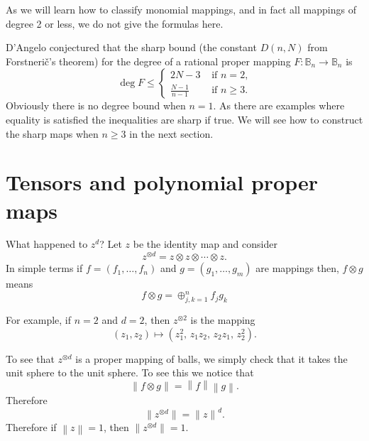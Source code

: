 \documentclass[12pt,openany]{book}
\newcommand{\norm}[1]{\left\lVert {#1} \right\rVert}
\newcommand{\bB}{{\mathbb{B}}}
\newcommand{\sectionnewpage}{}
\theoremstyle{plain}
\theoremstyle{remark}
\theoremstyle{definition}
\theoremstyle{exercise}
\theoremstyle{example}
\begin{document}
As we will learn how to classify monomial mappings, and in fact all mappings
of degree 2 or less, we do not give the formulas here.

D'Angelo
conjectured that the sharp bound
(the constant $D(n,N)$ from Forstneri\v{c}'s theorem)
for the degree of a rational proper mapping
$F \colon \bB_n \to \bB_n$ is
\begin{equation}
\deg F \leq
\begin{cases}
2N-3 & \text{ if $n=2$,} \\
\frac{N-1}{n-1} & \text{ if $n\geq 3$.}
\end{cases}
\end{equation}
Obviously there is no degree bound when $n=1$.  As there are examples where
equality is satisfied the inequalities are sharp if true.  We will see how
to construct the sharp maps when $n \geq 3$ in the next section.


\sectionnewpage
\section{Tensors and polynomial proper maps}

What happened to $z^d$?  Let $z$ be the identity map and consider
\begin{equation}
z^{\otimes d} =  z \otimes z \otimes \cdots \otimes z .
\end{equation}
In simple terms if $f = (f_1,\ldots,f_n)$
and $g=(g_1,\ldots,g_m)$ are mappings then,
$f \otimes g$ means
\begin{equation}
f \otimes g = \oplus_{j,k=1}^n f_j g_k
\end{equation}

For example, if $n=2$ and $d=2$, then $z^{\otimes 2}$
is the mapping
\begin{equation}
(z_1,z_2) \mapsto
(z_1^2, \, z_1z_2, \, z_2z_1, \, z_2^2) .
\end{equation}

To see that $z^{\otimes d}$ is a proper mapping of balls, we simply check
that
it takes the unit sphere to the unit sphere.
To see this we notice that
\begin{equation}
\norm{ f \otimes g } =
\norm{f} \norm{g} .
\end{equation}
Therefore
\begin{equation}
\lVert z^{\otimes d} \rVert = 
{\lVert z \rVert}^d .
\end{equation}
Therefore if $\norm{z} = 1$, then 
$\lVert z^{\otimes d} \rVert = 1$.
\end{document}

